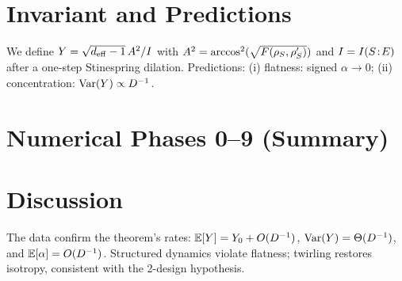 \section{Invariant and Predictions}
We define $Y=\sqrt{d_{\mathrm{eff}}-1}\,A^2/I$ with $A^2=\arccos^2(\sqrt{F(\rho_S,\rho_S')})$ and $I=I(S\!:\!E)$ after a one-step Stinespring dilation. Predictions: (i) flatness: signed $\alpha \to 0$; (ii) concentration: $\mathrm{Var}(Y)\propto D^{-1}$.

\section{Numerical Phases 0--9 (Summary)}


\section{Discussion}
The data confirm the theorem's rates: $\mathbb{E}[Y]=Y_0+O(D^{-1})$, $\mathrm{Var}(Y)=\Theta(D^{-1})$, and $\mathbb{E}[\alpha]=O(D^{-1})$. Structured dynamics violate flatness; twirling restores isotropy, consistent with the 2-design hypothesis.
